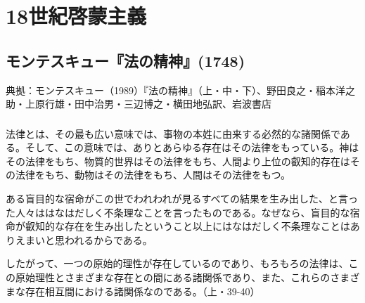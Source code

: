 

\chapter{18世紀啓蒙主義}



\section{モンテスキュー『法の精神』(1748)}



典拠：モンテスキュー（1989）『法の精神』（上・中・下）、野田良之・稲本洋之助・上原行雄・田中治男・三辺博之・横田地弘訳、岩波書店







\subsection{}


法律とは、その最も広い意味では、事物の本姓に由来する必然的な諸関係である。そして、この意味では、ありとあらゆる存在はその法律をもっている。神はその法律をもち、物質的世界はその法律をもち、人間より上位の叡知的存在はその法律をもち、動物はその法律をもち、人間はその法律をもつ。

ある盲目的な宿命がこの世でわれわれが見るすべての結果を生み出した、と言った人々ははなはだしく不条理なことを言ったものである。なぜなら、盲目的な宿命が叡知的な存在を生み出したということ以上にはなはだしく不条理なことはありえまいと思われるからである。

したがって、一つの原始的理性が存在しているのであり、もろもろの法律は、この原始理性とさまざまな存在との間にある諸関係であり、また、これらのさまざまな存在相互間における諸関係なのである。（上・39-40）

\subsection{}


